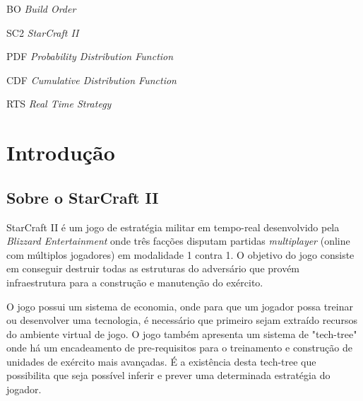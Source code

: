 \listoffigures*
\cleardoublepage

\listoftables*
\cleardoublepage

\begin{siglas}
	\item[BO]		\emph{Build Order}
	\item[SC2]		\emph{StarCraft II}
	\item[PDF]		\emph{Probability Distribution Function}
	\item[CDF]		\emph{Cumulative Distribution Function}
	\item[RTS]		\emph{Real Time Strategy}
\end{siglas}

\tableofcontents*
\cleardoublepage

\textual
	\chapter{Introdução}
		\section{Sobre o StarCraft II}

StarCraft II é um jogo de estratégia militar em tempo-real desenvolvido pela \textit{Blizzard Entertainment} onde três facções disputam partidas \textit{multiplayer} (online com múltiplos jogadores) em modalidade 1 contra 1. O objetivo do jogo consiste em conseguir destruir todas as \glspl{estrutura} do adversário que provém infraestrutura para a construção e manutenção do exército.

O jogo possui um sistema de economia, onde para que um jogador possa treinar ou desenvolver uma tecnologia, é necessário que primeiro sejam extraído \glspl{recurso} do ambiente virtual de jogo. O jogo também apresenta um sistema de "\gls{tech-tree}" onde há um encadeamento de pre-requisitos para o treinamento e construção de \glspl{unidade} de exército mais avançadas. É a existência desta \gls{tech-tree} que possibilita que seja possível inferir e prever uma determinada estratégia do jogador. 


